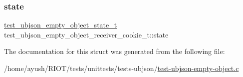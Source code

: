 \subsubsection{\texorpdfstring{state}{state}}
{\footnotesize\ttfamily \hyperlink{test-ubjson-empty-object_8c_aa84ec89ba6c4636d02f6f565e22cd539}{test\+\_\+ubjson\+\_\+empty\+\_\+object\+\_\+state\+\_\+t} test\+\_\+ubjson\+\_\+empty\+\_\+object\+\_\+receiver\+\_\+cookie\+\_\+t\+::state}



The documentation for this struct was generated from the following file\+:\begin{DoxyCompactItemize}
\item 
/home/ayush/\+R\+I\+O\+T/tests/unittests/tests-\/ubjson/\hyperlink{test-ubjson-empty-object_8c}{test-\/ubjson-\/empty-\/object.\+c}\end{DoxyCompactItemize}

